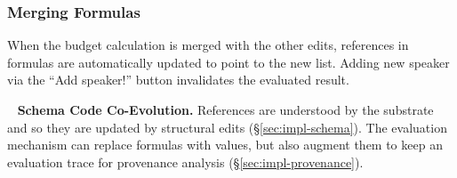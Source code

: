 \documentclass[sigconf]{acmart}
\newcommand*\circled[1]{\textnormal{\footnotesize\sffamily\bfseries\protect\tikz[baseline=(char.base)]{
  \node[shape=circle,fill=black,text=white,draw,inner sep=1pt] (char) {#1};}}}
\DeclareRobustCommand{\keyideabox}[3]{\begin{tcolorbox}[breakable,
  boxsep=5pt,left=0pt,right=0pt,top=0pt,bottom=0pt,width=\dimexpr\columnwidth\relax,
  colback=gray!20,colframe=gray!20,
  enlarge bottom by=0pt,enlarge top by=0pt,
  arc=0pt,outer arc=0pt]
\lettrine[lraise=0.3]{\LARGE #1}{~}
\small \textbf{#2.} #3
\end{tcolorbox}
}
\begin{document}
\subsubsection*{\circled{G} Merging Formulas} When the budget calculation is merged with the
other edits, references in formulas are automatically updated to point to the new list.
Adding new speaker via the ``Add speaker!'' button invalidates the evaluated result.

\keyideabox{\faLightbulbO}{Schema Code Co-Evolution}{References are understood
by the substrate and so they are updated by structural edits (\S\ref{sec:impl-schema}). The
evaluation mechanism can replace formulas with values, but also augment them to keep an evaluation
trace for provenance analysis (\S\ref{sec:impl-provenance}).}


\end{document}
